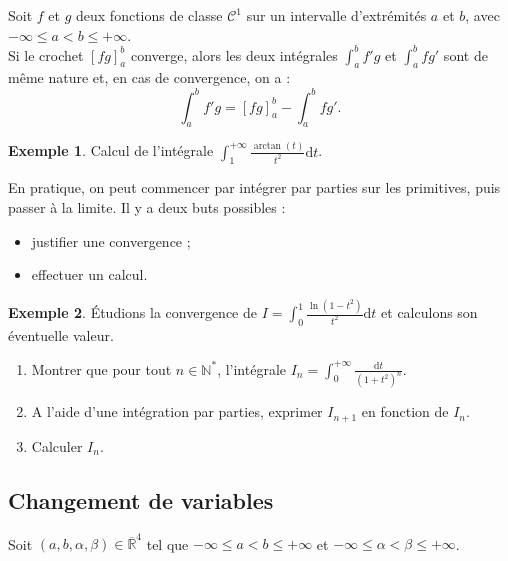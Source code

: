 \documentclass[french]{article}
\newcommand{\N}{\mathbb{N}}
\newcommand{\R}{\mathbb{R}}
\newcommand{\st}{^*}
\renewcommand{\d}{\text{d}}
\theoremstyle{plain}
\theoremstyle{definition}
\newtheorem*{ex}{Exemple}
\theoremstyle{remark}
\begin{document}
\begin{prop}%
	Soit $f$ et $g$ deux fonctions de classe $\mathcal{C}^1$ sur un intervalle d'extrémités $a$ et $b$, avec $-\infty\leqslant a<b\leqslant+\infty$.\\
	Si le crochet $[fg]_a^b$ converge, alors les deux intégrales $\displaystyle\int_{a}^{b}f'g$ et $\displaystyle\int_{a}^{b}fg'$ sont de même nature et, en cas de convergence, on a : $$\int_{a}^{b}f'g=[fg]_a^b-\int_{a}^{b}fg'.$$
\end{prop}

\begin{ex}
	Calcul de l'intégrale $\displaystyle\int_{1}^{+\infty}\frac{\arctan(t)}{t^2}\d t$.
\end{ex}

\begin{met}
	En pratique, on peut commencer par intégrer par parties sur les primitives, puis passer à la limite. Il y a deux buts possibles :
	\begin{itemize}
		\item justifier une convergence ;
		\item effectuer un calcul.
	\end{itemize}
\end{met}

\begin{ex}
	Étudions la convergence de $I=\displaystyle\int_{0}^{1}\frac{\ln(1-t^2)}{t^2}\d t$ et calculons son éventuelle valeur. %
\end{ex}

\begin{exo}
	\begin{enumerate}
		\item Montrer que pour tout $n\in\N\st$, l'intégrale $I_n=\displaystyle\int_{0}^{+\infty}\frac{\d t}{(1+t^2)^n}$.
		\item A l'aide d'une intégration par parties, exprimer $I_{n+1}$ en fonction de $I_n$.
		\item Calculer $I_n$.
	\end{enumerate}
\end{exo}

\subsection{Changement de variables}

Soit $(a,b,\alpha,\beta)\in\overline{\R}^4$ tel que $-\infty\leqslant a<b\leqslant+\infty$ et $-\infty\leqslant\alpha<\beta\leqslant+\infty$.
\end{document}
